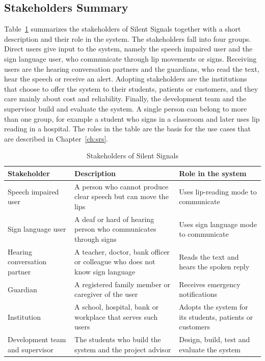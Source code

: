 \documentclass{FastFyp}
\begin{document}
\subsection{Stakeholders Summary}
Table~\ref{tab:stake} summarizes the stakeholders of Silent Signals together with a short description and their role in the system. The stakeholders fall into four groups. Direct users give input to the system, namely the speech impaired user and the sign language user, who communicate through lip movements or signs. Receiving users are the hearing conversation partners and the guardians, who read the text, hear the speech or receive an alert. Adopting stakeholders are the institutions that choose to offer the system to their students, patients or customers, and they care mainly about cost and reliability. Finally, the development team and the supervisor build and evaluate the system. A single person can belong to more than one group, for example a student who signs in a classroom and later uses lip reading in a hospital. The roles in the table are the basis for the use cases that are described in Chapter~\ref{ch:srs}.
\begin{table}[!h]
\centering
\caption{Stakeholders of Silent Signals}
\begin{tabular}{|p{3.2cm}|p{5.8cm}|p{5cm}|}
\hline
\textbf{Stakeholder} & \textbf{Description} & \textbf{Role in the system} \\
\hline
Speech impaired user & A person who cannot produce clear speech but can move the lips & Uses lip-reading mode to communicate \\
\hline
Sign language user & A deaf or hard of hearing person who communicates through signs & Uses sign language mode to communicate \\
\hline
Hearing conversation partner & A teacher, doctor, bank officer or colleague who does not know sign language & Reads the text and hears the spoken reply \\
\hline
Guardian & A registered family member or caregiver of the user & Receives emergency notifications \\
\hline
Institution & A school, hospital, bank or workplace that serves such users & Adopts the system for its students, patients or customers \\
\hline
Development team and supervisor & The students who build the system and the project advisor & Design, build, test and evaluate the system \\
\hline
\end{tabular}
\label{tab:stake}
\end{table}
\end{document}
